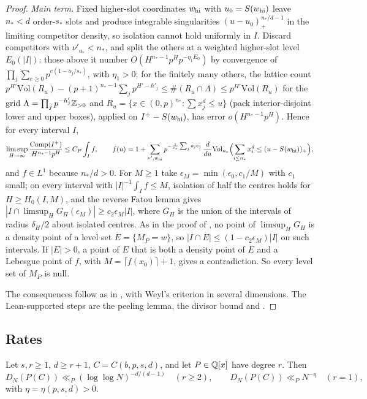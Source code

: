 \documentclass[11pt]{article}
\begin{document}
\begin{proof}
\emph{Main term.} Fixed higher-slot coordinates $w_{\rm hi}$ with $u_0=S(w_{\rm hi})$ leave $n_*<d$
order-$s_*$ slots and produce integrable singularities $(u-u_0)_+^{n_*/d-1}$ in the limiting competitor
density, so isolation cannot hold uniformly in $I$. Discard competitors with $\nu'_{a_*}<n_*$, and split the
others at a weighted higher-slot level $E_0(|I|)$: those above it number
$O(H^{n_*-1}p^Hp^{-\eta_1E_0})$ by convergence of $\prod_j\sum_{e\ge0}p^{e(1-o_j/s_*)}$, with $\eta_1>0$; for
the finitely many others, the lattice count
$p^{H'}\mathrm{Vol}(R_u)-(p+1)^{n_*-1}\sum_jp^{H'-h'_j}\le\#(R_u\cap\Lambda)\le p^{H'}\mathrm{Vol}(R_u)$ for the grid
$\Lambda=\prod_jp^{-h'_j}\mathbb Z_{>0}$ and $R_u=\{x\in(0,p)^{n_*}:\sum x_j^d\le u\}$ (pack interior-disjoint lower and
upper boxes), applied on $I^+-S(w_{\rm hi})$, has error $o(H^{n_*-1}p^H)$. Hence for every interval $I$,
\[
\limsup_{H\to\infty}\frac{\mathrm{Comp}(I^+)}{H^{n_*-1}p^H}\le C_P\int_If,\qquad
f(u)=1+\sum_{\nu',w_{\rm hi}}p^{-\frac1{s_*}\sum_jo_je_j}\,\frac{d}{du}\mathrm{Vol}_{n_*}\Bigl(\sum_{i\le n_*}x_i^d\le
(u-S(w_{\rm hi}))_+\Bigr),
\]
and $f\in L^1$ because $n_*/d>0$. For $M\ge1$ take $\epsilon_M=\min(\epsilon_0,c_1/M)$ with $c_1$ small; on
every interval with $|I|^{-1}\int_If\le M$, isolation of half the centres holds for $H\ge H_0(I,M)$, and the
reverse Fatou lemma gives $|I\cap\limsup_HG_H(\epsilon_M)|\ge c_2\epsilon_M|I|$, where $G_H$ is the union of the
intervals of radius $\delta_H/2$ about isolated centres. As in the proof of , no point of
$\limsup_HG_H$ is a density point of a level set $E=\{M_P=w\}$, so $|I\cap E|\le(1-c_2\epsilon_M)|I|$ on such
intervals. If $|E|>0$, a point of $E$ that is both a density point of $E$ and a Lebesgue point of $f$, with
$M=\lceil f(x_0)\rceil+1$, gives a contradiction. So every level set of $M_P$ is null.

The consequences follow as in , with Weyl's criterion in several dimensions. The
Lean-supported steps are the peeling lemma, the divisor bound and .
\end{proof}

\subsection{Rates}\label{sec:rates}

\begin{theorem}\label{thm:effective}
Let $s,r\ge1$, $d\ge r+1$, $C=C(b,p,s,d)$, and let $P\in\mathbb Q[x]$ have degree $r$. Then
\[
D_N(P(C))\ll_P(\log\log N)^{-d/(d-1)}\quad(r\ge2),\qquad D_N(P(C))\ll_PN^{-\eta}\quad(r=1),
\]
with $\eta=\eta(p,s,d)>0$.
\end{theorem}
\end{document}
